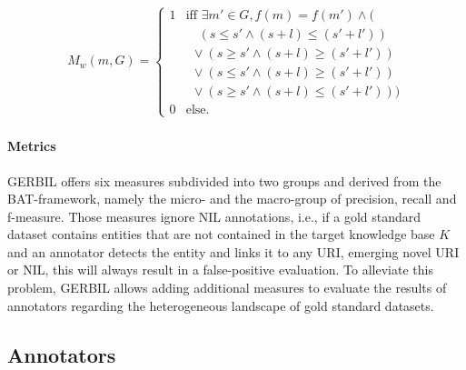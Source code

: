 \begin{align}
M_w (m,G)=
\begin{cases}
1 &  \text{iff }\exists m' \in G, f(m) = f(m')  \land (\\
 &\ \ \ \,\, ( s \leq s' \land (s+l) \leq (s'+l') )\\ %
 &\ \ \lor ( s \geq s' \land (s+l) \geq (s'+l') )\\ %
 &\ \ \lor ( s \leq s' \land (s+l) \geq (s'+l') )\\ %
 &\ \ \lor ( s \geq s' \land (s+l) \leq (s'+l') ))\\ %
0 & \text{else.}
\end{cases}
\end{align}


\paragraph{Metrics}
GERBIL offers six measures subdivided into two groups and derived from the BAT-framework, namely the micro- and the macro-group of precision, recall and f-measure.
Those measures ignore NIL annotations, i.e., if a gold standard dataset contains entities that are not contained in the target knowledge base $K$ and an annotator detects the entity and links it to any URI, emerging novel URI or NIL, this will always result in a false-positive evaluation. 
To alleviate this problem, GERBIL allows adding additional measures to evaluate the results of annotators regarding the heterogeneous landscape of gold standard datasets.

\subsection{Annotators}
\label{sec:annotators}

